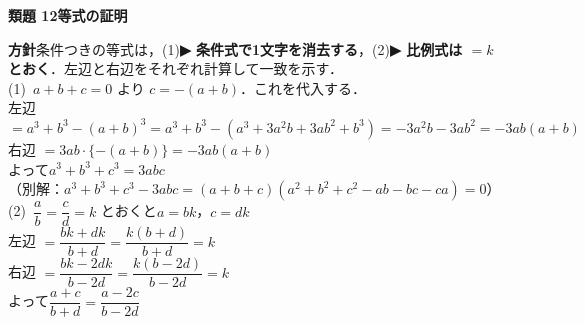 \documentclass[a4paper,11pt]{ltjsarticle}
\newcommand{\ans}[2]{\Needspace{5\baselineskip}\vspace{6pt}%
  {\sffamily\bfseries 類題 #1\quad #2}\par}
\newcommand{\point}[1]{\textsf{\bfseries ▶ #1}}
\begin{document}
\ans{12}{等式の証明}
\begin{kai}
\textbf{方針}\quad 条件つきの等式は，(1)\point{条件式で1文字を消去する}，(2)\point{比例式は $=k$ とおく}．左辺と右辺をそれぞれ計算して一致を示す．\\[2pt]
(1)\ $a+b+c=0$ より $c=-(a+b)$．これを代入する．\\
\hspace*{1.5em}左辺 $=a^3+b^3-(a+b)^3=a^3+b^3-(a^3+3a^2b+3ab^2+b^3)=-3a^2b-3ab^2=-3ab(a+b)$\\
\hspace*{1.5em}右辺 $=3ab\cdot\{-(a+b)\}=-3ab(a+b)$\\
\hspace*{1.5em}よって\quad $a^3+b^3+c^3=3abc$\\
\hspace*{1.5em}（別解：$a^3+b^3+c^3-3abc=(a+b+c)(a^2+b^2+c^2-ab-bc-ca)=0$）\\[2pt]
(2)\ $\dfrac ab=\dfrac cd=k$ とおくと\quad $a=bk$，$c=dk$\\
\hspace*{1.5em}左辺 $=\dfrac{bk+dk}{b+d}=\dfrac{k(b+d)}{b+d}=k$\\
\hspace*{1.5em}右辺 $=\dfrac{bk-2dk}{b-2d}=\dfrac{k(b-2d)}{b-2d}=k$\\
\hspace*{1.5em}よって\quad $\dfrac{a+c}{b+d}=\dfrac{a-2c}{b-2d}$
\end{kai}
\end{document}
